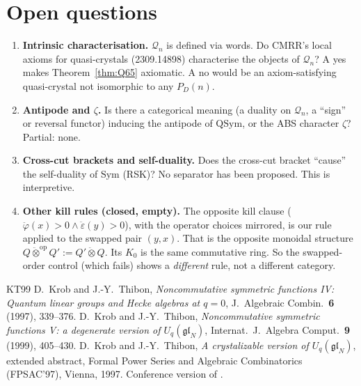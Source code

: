 \documentclass[11pt]{amsart}
\theoremstyle{definition}
\theoremstyle{remark}
\newcommand{\eps}{\ddot\varepsilon}
\newcommand{\vphi}{\ddot\varphi}
\newcommand{\qt}{\mathbin{\ddot\otimes}}
\newcommand{\QSym}{\mathrm{QSym}}
\newcommand{\Sym}{\mathrm{Sym}}
\newcommand{\cQ}{\mathcal{Q}}
\begin{document}
\section{Open questions}
\begin{enumerate}[leftmargin=*]
\item \textbf{Intrinsic characterisation.} $\cQ_n$ is defined via words. Do CMRR's local axioms for quasi-crystals (2309.14898) characterise the objects of $\cQ_n$? A yes makes Theorem~\ref{thm:Q65} axiomatic. A no would be an axiom-satisfying quasi-crystal not isomorphic to any $P_D(n)$.
\item \textbf{Antipode and $\zeta$.} Is there a categorical meaning (a duality on $\cQ_n$, a ``sign'' or reversal functor) inducing the antipode of $\QSym$, or the ABS character $\zeta$? Partial: none.
\item \textbf{Cross-cut brackets and self-duality.} Does the cross-cut bracket ``cause'' the self-duality of $\Sym$ (RSK)? No separator has been proposed. This is interpretive.
\item \textbf{Other kill rules (closed, empty).} The opposite kill clause ($\vphi(x)>0\wedge\eps(y)>0$), with the operator choices mirrored, is our rule applied to the swapped pair $(y,x)$. That is the opposite monoidal structure $Q\qt^{\mathrm{op}}Q':=Q'\qt Q$. Its $K_0$ is the same commutative ring. So the swapped-order control (which fails) shows a \emph{different} rule, not a different category.
\end{enumerate}

\begin{thebibliography}{KT99}
 D.~Krob and J.-Y.~Thibon, \emph{Noncommutative symmetric functions IV: Quantum linear groups and Hecke algebras at $q=0$}, J.\ Algebraic Combin.\ \textbf{6} (1997), 339--376.
 D.~Krob and J.-Y.~Thibon, \emph{Noncommutative symmetric functions V: a degenerate version of $U_q(\mathfrak{gl}_N)$}, Internat.\ J.\ Algebra Comput.\ \textbf{9} (1999), 405--430.
 D.~Krob and J.-Y.~Thibon, \emph{A crystalizable version of $U_q(\mathfrak{gl}_N)$}, extended abstract, Formal Power Series and Algebraic Combinatorics (FPSAC'97), Vienna, 1997. Conference version of \cite{KT5}.
\end{thebibliography}

\appendix
\end{document}
